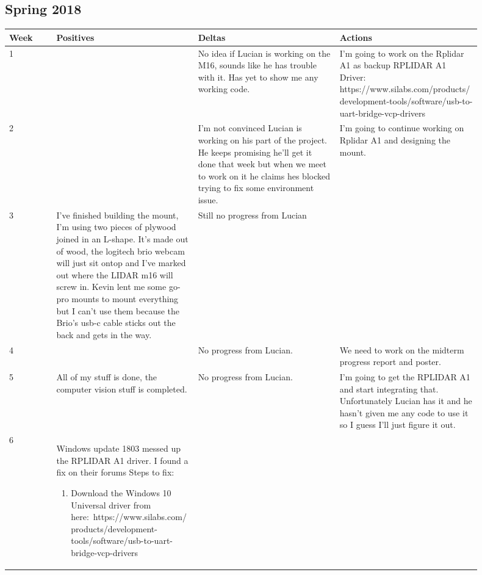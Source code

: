 \documentclass[onecolumn, draftclsnofoot,10pt, compsoc]{IEEEtran}
\begin{document}
\begin{singlespace}
	\subsection{Spring 2018}
		\begin{longtable}{|l|p{0.3\linewidth}|p{0.3\linewidth}|p{0.3\linewidth}|}\hline \textbf{Week} & \textbf{Positives} & \textbf{Deltas} & \textbf{Actions}\\\hline
		1	&
			&
			No idea if Lucian is working on the M16, sounds like he has trouble with it.
			Has yet to show me any working code.
			&
			I'm going to  work on the Rplidar A1 as backup
			RPLIDAR A1 Driver: https://www.silabs.com/products/development-tools/software/usb-to-uart-bridge-vcp-drivers
		\\\hline
		2	&
			&
			I'm not convinced Lucian is working on his part of the project.
			He keeps promising he'll get it done that week but when we meet to work on it he claims hes blocked trying to fix some environment issue.
			&
			I'm going to continue working on Rplidar A1 and designing the mount.
		\\\hline
		3	&
			I've finished building the mount, I'm using two pieces of plywood joined in an L-shape. It's made out of wood, the logitech brio webcam will just sit ontop and I've marked out where the LIDAR m16 will screw in. Kevin lent me some go-pro mounts to mount everything but I can't use them because the Brio's usb-c cable sticks out the back and gets in the way.
			&
			Still no progress from Lucian
			&
		\\\hline
		4	&
			&
			No progress from Lucian.
			&
			We need to work on the midterm progress report and poster.
		\\\hline
		5	&
			All of my stuff is done, the computer vision stuff is completed. 
			&
			No progress from Lucian.
			&
			I'm going to get the RPLIDAR A1 and start integrating that. Unfortunately Lucian has it and he hasn't given me any code to use it so I guess I'll just figure it out.
		\\\hline
		6	&
			Windows update 1803 messed up the RPLIDAR A1 driver. I found a fix on their forums
			Steps to fix:
			\begin{enumerate}
				\item Download the Windows 10 Universal driver from here: https://www.silabs.com/products/development-tools/software/usb-to-uart-bridge-vcp-drivers


\end{enumerate}
\end{longtable}
\end{singlespace}
\end{document}
